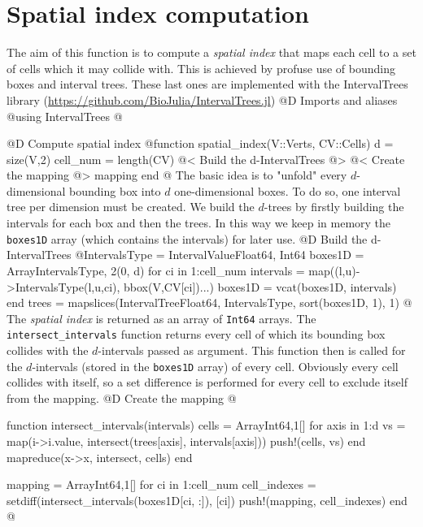 \documentclass[10pt,oneside]{article}
\begin{document}
\section{Spatial index computation}
The aim of this function is to compute a \textit{spatial index} that maps
each cell to a set of cells which it may collide with.
This is achieved by profuse use of bounding boxes and interval trees. 
These last ones are implemented with the IntervalTrees library
(\url{https://github.com/BioJulia/IntervalTrees.jl})
@D Imports and aliases
@{using IntervalTrees
@}

@D Compute spatial index
@{function spatial_index(V::Verts, CV::Cells)
    d = size(V,2)
    cell_num = length(CV)
    @< Build the d-IntervalTrees @>
    @< Create the mapping @>
    mapping
end
@}
The basic idea is to "unfold" every $d$-dimensional bounding box into $d$ one-dimensional boxes.
To do so, one interval tree per dimension must be created. 
We build the $d$-trees by firstly building the intervals for each box and then the trees.
In this way we keep in memory the \texttt{boxes1D} array (which contains the intervals) for later use.
@D Build the d-IntervalTrees
@{IntervalsType = IntervalValue{Float64, Int64}
boxes1D = Array{IntervalsType, 2}(0, d)
for ci in 1:cell_num
    intervals = map((l,u)->IntervalsType(l,u,ci), bbox(V,CV[ci])...)
    boxes1D = vcat(boxes1D, intervals)
end
trees = mapslices(IntervalTree{Float64, IntervalsType}, sort(boxes1D, 1), 1)
@}
The \textit{spatial index} is returned as an array of \texttt{Int64} arrays.
The \texttt{intersect\_intervals} function returns every cell of which its bounding box collides with 
the $d$-intervals passed as argument. This function then is called for the $d$-intervals (stored in the \texttt{boxes1D} array) of every cell.
Obviously every cell collides with itself, so a set difference is performed for every cell to exclude itself from the mapping.
@D Create the mapping
@{function intersect_intervals(intervals)
    cells = Array{Int64,1}[]
    for axis in 1:d
        vs = map(i->i.value, intersect(trees[axis], intervals[axis]))
        push!(cells, vs)
    end
    mapreduce(x->x, intersect, cells)
end

mapping = Array{Int64,1}[]
for ci in 1:cell_num
    cell_indexes = setdiff(intersect_intervals(boxes1D[ci, :]), [ci])
    push!(mapping, cell_indexes)
end
@}

\end{document}
